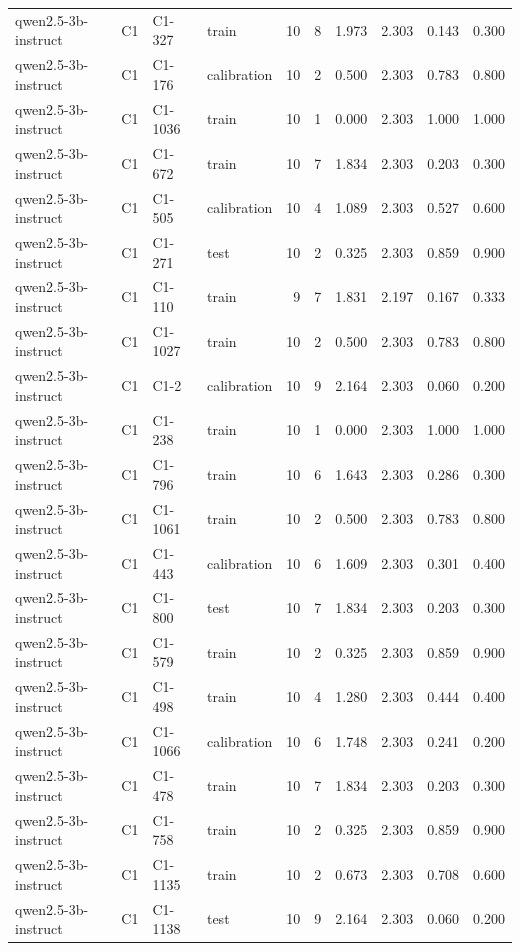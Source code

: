 \begin{table}
\begin{tabular}{llllrrrrrr}
qwen2.5-3b-instruct & C1 & C1-327 & train & 10 & 8 & 1.973 & 2.303 & 0.143 & 0.300 \\
qwen2.5-3b-instruct & C1 & C1-176 & calibration & 10 & 2 & 0.500 & 2.303 & 0.783 & 0.800 \\
qwen2.5-3b-instruct & C1 & C1-1036 & train & 10 & 1 & 0.000 & 2.303 & 1.000 & 1.000 \\
qwen2.5-3b-instruct & C1 & C1-672 & train & 10 & 7 & 1.834 & 2.303 & 0.203 & 0.300 \\
qwen2.5-3b-instruct & C1 & C1-505 & calibration & 10 & 4 & 1.089 & 2.303 & 0.527 & 0.600 \\
qwen2.5-3b-instruct & C1 & C1-271 & test & 10 & 2 & 0.325 & 2.303 & 0.859 & 0.900 \\
qwen2.5-3b-instruct & C1 & C1-110 & train & 9 & 7 & 1.831 & 2.197 & 0.167 & 0.333 \\
qwen2.5-3b-instruct & C1 & C1-1027 & train & 10 & 2 & 0.500 & 2.303 & 0.783 & 0.800 \\
qwen2.5-3b-instruct & C1 & C1-2 & calibration & 10 & 9 & 2.164 & 2.303 & 0.060 & 0.200 \\
qwen2.5-3b-instruct & C1 & C1-238 & train & 10 & 1 & 0.000 & 2.303 & 1.000 & 1.000 \\
qwen2.5-3b-instruct & C1 & C1-796 & train & 10 & 6 & 1.643 & 2.303 & 0.286 & 0.300 \\
qwen2.5-3b-instruct & C1 & C1-1061 & train & 10 & 2 & 0.500 & 2.303 & 0.783 & 0.800 \\
qwen2.5-3b-instruct & C1 & C1-443 & calibration & 10 & 6 & 1.609 & 2.303 & 0.301 & 0.400 \\
qwen2.5-3b-instruct & C1 & C1-800 & test & 10 & 7 & 1.834 & 2.303 & 0.203 & 0.300 \\
qwen2.5-3b-instruct & C1 & C1-579 & train & 10 & 2 & 0.325 & 2.303 & 0.859 & 0.900 \\
qwen2.5-3b-instruct & C1 & C1-498 & train & 10 & 4 & 1.280 & 2.303 & 0.444 & 0.400 \\
qwen2.5-3b-instruct & C1 & C1-1066 & calibration & 10 & 6 & 1.748 & 2.303 & 0.241 & 0.200 \\
qwen2.5-3b-instruct & C1 & C1-478 & train & 10 & 7 & 1.834 & 2.303 & 0.203 & 0.300 \\
qwen2.5-3b-instruct & C1 & C1-758 & train & 10 & 2 & 0.325 & 2.303 & 0.859 & 0.900 \\
qwen2.5-3b-instruct & C1 & C1-1135 & train & 10 & 2 & 0.673 & 2.303 & 0.708 & 0.600 \\
qwen2.5-3b-instruct & C1 & C1-1138 & test & 10 & 9 & 2.164 & 2.303 & 0.060 & 0.200 \\

\end{tabular}
\end{table}
